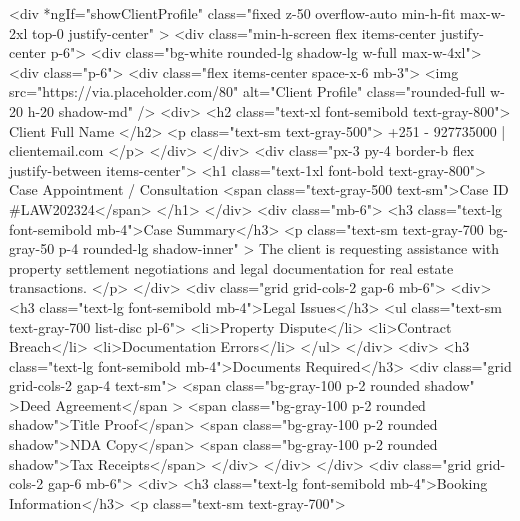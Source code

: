   <div
    *ngIf="showClientProfile"
    class="fixed z-50 overflow-auto min-h-fit max-w-2xl top-0 justify-center"
  >
    <div class="min-h-screen flex items-center justify-center p-6">
      <div class="bg-white rounded-lg shadow-lg w-full max-w-4xl">
        <div class="p-6">
          <div class="flex items-center space-x-6 mb-3">
            <img
              src="https://via.placeholder.com/80"
              alt="Client Profile"
              class="rounded-full w-20 h-20 shadow-md"
            />
            <div>
              <h2 class="text-xl font-semibold text-gray-800">
                Client Full Name
              </h2>
              <p class="text-sm text-gray-500">
                +251 - 927735000 | clientemail.com
              </p>
            </div>
          </div>
          <div class="px-3 py-4 border-b flex justify-between items-center">
            <h1 class="text-1xl font-bold text-gray-800">
              Case Appointment / Consultation
              <span class="text-gray-500 text-sm">Case ID #LAW202324</span>
            </h1>
          </div>
          <div class="mb-6">
            <h3 class="text-lg font-semibold mb-4">Case Summary</h3>
            <p
              class="text-sm text-gray-700 bg-gray-50 p-4 rounded-lg shadow-inner"
            >
              The client is requesting assistance with property settlement
              negotiations and legal documentation for real estate transactions.
            </p>
          </div>
          <div class="grid grid-cols-2 gap-6 mb-6">
            <div>
              <h3 class="text-lg font-semibold mb-4">Legal Issues</h3>
              <ul class="text-sm text-gray-700 list-disc pl-6">
                <li>Property Dispute</li>
                <li>Contract Breach</li>
                <li>Documentation Errors</li>
              </ul>
            </div>
            <div>
              <h3 class="text-lg font-semibold mb-4">Documents Required</h3>
              <div class="grid grid-cols-2 gap-4 text-sm">
                <span class="bg-gray-100 p-2 rounded shadow"
                  >Deed Agreement</span
                >
                <span class="bg-gray-100 p-2 rounded shadow">Title Proof</span>
                <span class="bg-gray-100 p-2 rounded shadow">NDA Copy</span>
                <span class="bg-gray-100 p-2 rounded shadow">Tax Receipts</span>
              </div>
            </div>
          </div>
          <div class="grid grid-cols-2 gap-6 mb-6">
            <div>
              <h3 class="text-lg font-semibold mb-4">Booking Information</h3>
              <p class="text-sm text-gray-700">
